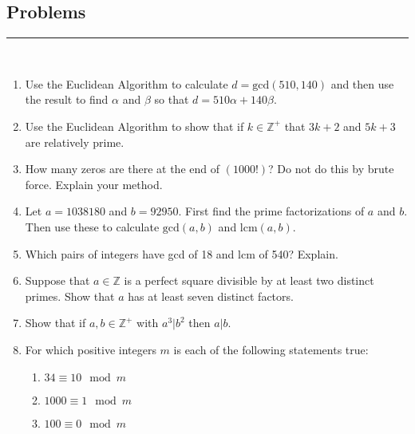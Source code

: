 \documentclass[class=article, crop=false]{standalone}
\def\integers{{\mathbb Z}}
\begin{document}
\subsection{Problems}
\rule{\textwidth}{1pt}\\
\begin{enumerate}

\item
 Use the Euclidean Algorithm to calculate $d=\mbox{gcd}(510,140)$
  and then use the result to find $\alpha$ and $\beta$ so
  that $d=510\alpha+140\beta$.

\item
  Use the Euclidean Algorithm to show that if $k\in\integers^+$ that
  $3k+2$ and $5k+3$ are relatively prime.

\item
  How many zeros are there at the end of $(1000!)$?  Do not do this
  by brute force.  Explain your method.

\item
  Let $a=1038180$ and $b=92950$.
  First find the prime factorizations of $a$ and $b$.
  Then use these to calculate $\mbox{gcd}(a,b)$ and $\mbox{lcm}(a,b)$.

\item
  Which pairs of integers have gcd of 18 and lcm of 540?  Explain.

\item
  Suppose that $a\in\integers$ is a perfect square
  divisible by at least two distinct primes.
  Show that $a$ has at least seven distinct factors.

\item
  Show that if $a,b\in\integers^+$ with $a^3\big|b^2$ then $a\big|b$.

\item For which positive integers $m$ is each of the following statements true:
\begin{enumerate}
\item
  $34\equiv 10 \mod m$
\item
  $1000\equiv 1 \mod m$
\item
  $100\equiv 0 \mod m$
\end{enumerate}
	
\end{enumerate}
\end{document}
